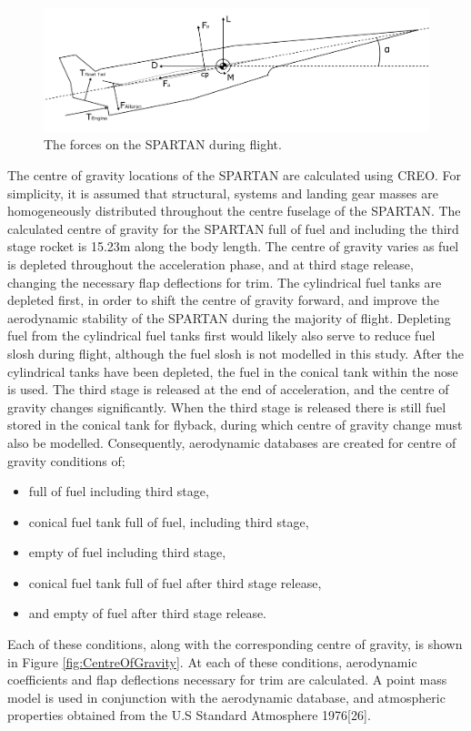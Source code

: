 		
		\begin{figure}[ht]
			\centering
			\includegraphics[width=0.7\linewidth]{figures/3_vehicle_design/SPARTANForces}
			\caption{The forces on the SPARTAN during flight.}
			\label{fig:SPARTANForces}
		\end{figure}
		
		
		The centre of gravity locations of the SPARTAN are calculated using CREO. For simplicity, it is assumed that structural, systems and landing gear masses are homogeneously distributed throughout the centre fuselage of the SPARTAN. 
		The calculated centre of gravity for the SPARTAN full of fuel and including the third stage rocket is 15.23m along the body length. The centre of gravity varies as fuel is depleted throughout the acceleration phase, and at third stage release, changing the necessary flap deflections for trim. The cylindrical fuel tanks are depleted first, in order to shift the centre of gravity forward, and improve the aerodynamic stability of the SPARTAN during the majority of flight. Depleting fuel from the cylindrical fuel tanks first would likely also serve to reduce fuel slosh during flight, although the fuel slosh is not modelled in this study. After the cylindrical tanks have been depleted, the fuel in the conical tank within the nose is used. The third stage is released at the end of acceleration, and the centre of gravity changes significantly. When the third stage is released there is still fuel stored in the conical tank for flyback, during which centre of gravity change must also be modelled. 
		Consequently, aerodynamic databases are created for centre of gravity conditions of; 
		\begin{itemize}
			\item full of fuel including third stage,
			\item conical fuel tank full of fuel, including third stage,
			\item empty of fuel including third stage,
			\item conical fuel tank full of fuel after third stage release,
			\item and empty of fuel after third stage release.
		\end{itemize}
		Each of these conditions, along with the corresponding centre of gravity, is shown in Figure \ref{fig:CentreOfGravity}. At each of these conditions, aerodynamic coefficients and flap deflections necessary for trim are calculated. A point mass model is used in conjunction with the aerodynamic database,
		and atmospheric properties obtained from the U.S Standard Atmosphere 1976[26].  
	
